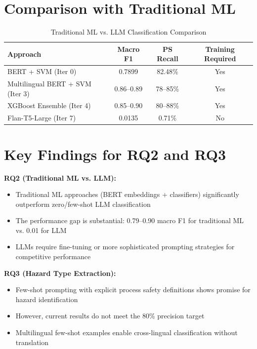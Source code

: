 \documentclass[11pt, titlepage, bibliography=totoc]{scrreprt}
\begin{document}
\section{Comparison with Traditional ML}

\begin{table}[htbp]
\centering
\caption{Traditional ML vs. LLM Classification Comparison}
\label{tab:ml-vs-llm}
\begin{tabular}{@{}lccc@{}}
\toprule
\textbf{Approach} & \textbf{Macro F1} & \textbf{PS Recall} & \textbf{Training Required} \\
\midrule
BERT + SVM (Iter 0) & 0.7899 & 82.48\% & Yes \\
Multilingual BERT + SVM (Iter 3) & 0.86--0.89 & 78--85\% & Yes \\
XGBoost Ensemble (Iter 4) & 0.85--0.90 & 80--88\% & Yes \\
Flan-T5-Large (Iter 7) & 0.0135 & 0.71\% & No \\
\bottomrule
\end{tabular}
\end{table}

\section{Key Findings for RQ2 and RQ3}

\textbf{RQ2 (Traditional ML vs. LLM):}
\begin{itemize}
    \item Traditional ML approaches (BERT embeddings + classifiers) significantly outperform zero/few-shot LLM classification
    \item The performance gap is substantial: 0.79--0.90 macro F1 for traditional ML vs. 0.01 for LLM
    \item LLMs require fine-tuning or more sophisticated prompting strategies for competitive performance
\end{itemize}

\textbf{RQ3 (Hazard Type Extraction):}
\begin{itemize}
    \item Few-shot prompting with explicit process safety definitions shows promise for hazard identification
    \item However, current results do not meet the 80\% precision target
    \item Multilingual few-shot examples enable cross-lingual classification without translation
\end{itemize}
\end{document}
